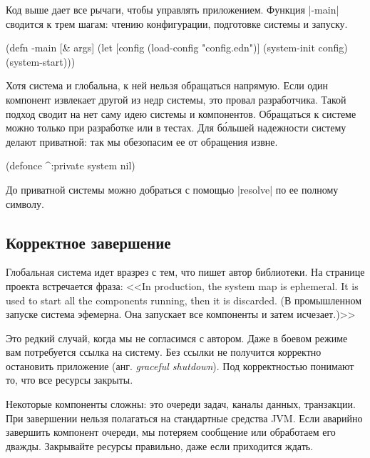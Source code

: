 Код выше дает все рычаги, чтобы управлять приложением. Функция \spverb|-main|
сводится к трем шагам: чтению конфигурации, подготовке системы и запуску.

\begin{english}
  \begin{clojure}
(defn -main [& args]
  (let [config (load-config "config.edn")]
    (system-init config)
    (system-start)))
  \end{clojure}
\end{english}

Хотя система и глобальна, к ней нельзя обращаться напрямую. Если один компонент
извлекает другой из недр системы, это провал разработчика. Такой подход сводит
на нет саму идею системы и компонентов. Обращаться к системе можно только при
разработке или в тестах. Для б\'{о}льшей надежности систему делают приватной:
так мы обезопасим ее от обращения извне.

\begin{english}
  \begin{clojure}
(defonce ^:private system nil)
  \end{clojure}
\end{english}

До приватной системы можно добраться с помощью \spverb|resolve| по ее полному
символу.

\subsection{Корректное завершение}

Глобальная система идет вразрез с тем, что пишет автор библиотеки. На странице
проекта встречается фраза: <<In production, the system map is ephemeral. It is
used to start all the components running, then it is discarded. (В промышленном
запуске система эфемерна. Она запускает все компоненты и затем исчезает.)>>

Это редкий случай, когда мы не согласимся с автором. Даже в боевом режиме вам
потребуется ссылка на систему. Без ссылки не получится корректно остановить
приложение (анг. \emph{graceful shutdown}). Под корректностью понимают то, что
все ресурсы закрыты.

Некоторые компоненты сложны: это очереди задач, каналы данных, транзакции. При
завершении нельзя полагаться на стандартные средства JVM. Если аварийно
завершить компонент очереди, мы потеряем сообщение или обработаем его
дважды. Закрывайте ресурсы правильно, даже если приходится ждать.

